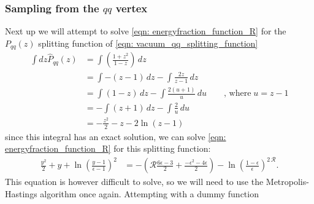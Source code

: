 \documentclass[main.tex]{subfiles}
\begin{document}
\subsubsection*{Sampling from the \(qq\) vertex}
Next up we will attempt to solve \autoref{eqn: energyfraction_function_R} for the \(P_{qq}(z)\) splitting function of \autoref{eqn: vacuum_qq_splitting_function}
\begin{align}
    \int dz\hat{P}_{qq}(z) &= \int \left(\frac{1+z^2}{1-z} \right)\, dz \nonumber \\
    &= \int -(z-1)\, dz - \int \frac{2z}{z-1} \, dz \nonumber \\
    &= \int (1-z) \, dz - \int \frac{2(u+1)}{u} \, du \qquad \text{, where}\; u=z-1 \nonumber \\
    &= -\int (z+1) \, dz - \int \frac{2}{u} \, du \nonumber  \\
    &= -\frac{z^2}{2} - z - 2 \ln(z-1) 
\end{align}
since this integral has an exact solution, we can solve \autoref{eqn: energyfraction_function_R} for this splitting function:
\begin{align}
    \frac{y^2}{2} + y + \ln \left( \frac{y-1}{\epsilon-1}\right)^2  &= -\left(\mathcal{R}  \frac{6 \epsilon-3}{2} + \frac{-\epsilon^2-4 \epsilon}{2}\right) -\ln\left(\frac{1-\epsilon}{\epsilon}\right)^{2\, \mathcal{R}}.
\end{align}
This equation is however difficult to solve, so we will need to use the Metropolis-Hastings algorithm once again. Attempting with a dummy function
\end{document}
